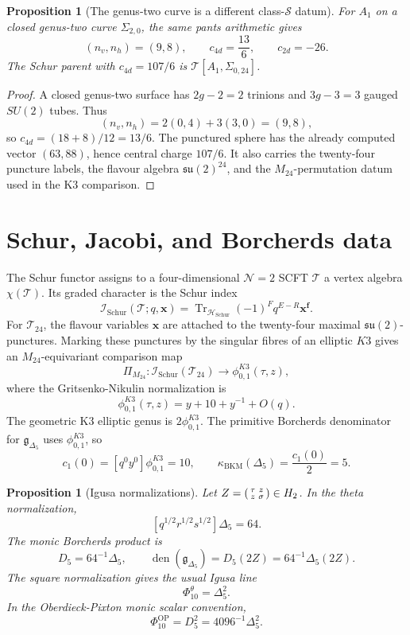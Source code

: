 \documentclass[11pt]{article}
\newtheorem{proposition}[theorem]{Proposition}
\providecommand{\HH}{\mathbb{H}}
\providecommand{\cH}{\mathcal{H}}
\providecommand{\cI}{\mathcal{I}}
\providecommand{\cS}{\mathcal{S}}
\providecommand{\cT}{\mathcal{T}}
\providecommand{\fg}{\mathfrak{g}}
\providecommand{\fsu}{\mathfrak{su}}
\providecommand{\kBKM}{\kappa_{\mathrm{BKM}}}
\providecommand{\Ntwo}{\mathcal{N}{=}2}
\begin{document}
\begin{proposition}[The genus-two curve is a different class-\(\cS\) datum]
\label{prop:sigma20-different}
For \(A_1\) on a closed genus-two curve \(\Sigma_{2,0}\), the same
pants arithmetic gives
\[
  (n_v,n_h)=(9,8),\qquad
  c_{4d}=\frac{13}{6},\qquad
  c_{2d}=-26.
\]
The Schur parent with \(c_{4d}=107/6\) is
\(\cT[A_1,\Sigma_{0,24}]\).
\end{proposition}

\begin{proof}
A closed genus-two surface has \(2g-2=2\) trinions and \(3g-3=3\)
gauged \(SU(2)\) tubes. Thus
\[
  (n_v,n_h)=2(0,4)+3(3,0)=(9,8),
\]
so \(c_{4d}=(18+8)/12=13/6\). The punctured sphere has the already
computed vector \((63,88)\), hence central charge \(107/6\). It also
carries the twenty-four puncture labels, the flavour algebra
\(\fsu(2)^{24}\), and the \(M_{24}\)-permutation datum used in the
K3 comparison.
\end{proof}

\section{Schur, Jacobi, and Borcherds data}

The Schur functor assigns to a four-dimensional \(\Ntwo\) SCFT \(\cT\)
a vertex algebra \(\chi(\cT)\). Its graded character is the Schur
index
\[
  \cI_{\mathrm{Schur}}(\cT;q,\mathbf{x})
  =
  \operatorname{Tr}_{\cH_{\mathrm{Schur}}}
  (-1)^Fq^{E-R}\mathbf{x}^{\mathbf f}.
\]
For \(\cT_{24}\), the flavour variables \(\mathbf{x}\) are attached to
the twenty-four maximal \(\fsu(2)\)-punctures. Marking these punctures
by the singular fibres of an elliptic \(K3\) gives an \(M_{24}\)-equivariant
comparison map
\[
  \Pi_{M_{24}}\colon
  \cI_{\mathrm{Schur}}(\cT_{24})
  \longrightarrow
  \phi_{0,1}^{K3}(\tau,z),
\]
where the Gritsenko-Nikulin normalization is
\[
  \phi_{0,1}^{K3}(\tau,z)=y+10+y^{-1}+O(q).
\]
The geometric K3 elliptic genus is \(2\phi_{0,1}^{K3}\). The primitive
Borcherds denominator for \(\fg_{\Delta_5}\) uses
\(\phi_{0,1}^{K3}\), so
\[
  c_1(0)=[q^0y^0]\phi_{0,1}^{K3}=10,\qquad
  \kBKM(\Delta_5)=\frac{c_1(0)}{2}=5.
\]

\begin{proposition}[Igusa normalizations]
\label{prop:igusa-normalizations}
Let \(Z=\begin{psmallmatrix}\tau&z\\ z&\sigma\end{psmallmatrix}\in\HH_2\).
In the theta normalization,
\[
  [q^{1/2}r^{1/2}s^{1/2}]\Delta_5=64.
\]
The monic Borcherds product is
\[
  D_5=64^{-1}\Delta_5,
  \qquad
  \operatorname{den}(\fg_{\Delta_5})=D_5(2Z)=64^{-1}\Delta_5(2Z).
\]
The square normalization gives the usual Igusa line
\[
  \Phi_{10}^{\theta}=\Delta_5^2.
\]
In the Oberdieck-Pixton monic scalar convention,
\[
  \Phi_{10}^{\mathrm{OP}}=D_5^2=4096^{-1}\Delta_5^2.
\]
\end{proposition}
\end{document}
